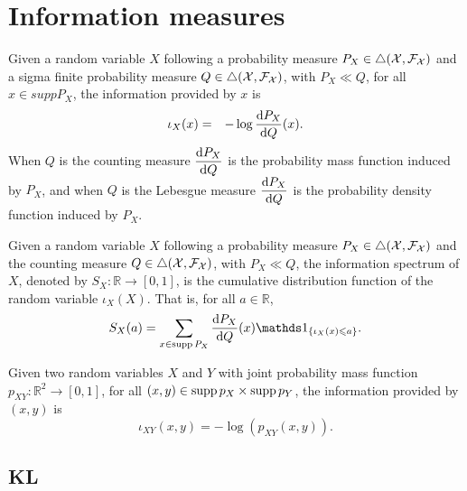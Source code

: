 \documentclass[lettersize,onecolumn]{IEEEtran}
\begin{document}
\section{Information measures}\label{DefInformation} 
\begin{definition} [Information]
Given a random variable $X$ following a probability measure $P_X \in \triangle(\mathcal X, \mathcal F_\mathcal X)$ and a sigma finite probability measure $Q \in \triangle(\mathcal X, \mathcal F_\mathcal X)$, with $P_X\ll Q$, for all $x \in suppP_X$, the information provided by $x$ is
\begin{eqnarray}
\iota_X(x) & =& - \log \displaystyle \frac{\mathrm{d}{P_X}}{\mathrm{d}{Q}}(x).
\end{eqnarray}
When $Q$ is the counting measure $\displaystyle \frac{\mathrm{d}{P_X}}{\mathrm{d}{Q}}$ is the probability mass function induced by $P_X$, and when $Q$ is the Lebesgue measure $\displaystyle \frac{\mathrm{d}{P_X}}{\mathrm{d}{Q}}$ is the probability density function induced by $P_X$.
\end{definition}

\begin{definition}\label{DefInfoSpectrum}  
Given a random variable $X$ following a probability measure $P_X \in \triangle(\mathcal X, \mathcal F_\mathcal X)$ and the counting measure $Q \in \triangle(\mathcal X, \mathcal F_\mathcal X) $, with $P_X\ll Q$, the information spectrum of $X$, denoted by $S_X: \mathds{R} \rightarrow [0,1]$, is the cumulative distribution function of the random variable $\iota_{X}(X)$. That is, for all $a \in \mathds{R}$,
\begin{equation}
S_X(a) = \sum_{x \in \supp{P_X}} \RND{P_X}{Q}(x) \ind{\iota_{X}(x) \leqslant a}.
\end{equation}
\end{definition}

\begin{definition}\label{DefJointInformation} 
Given two random variables $X$ and $Y$  with joint probability mass function $p_{X Y}: \mathds{R}^2 \rightarrow [0,1]$, for all $(x,y) \in \mathrm{supp}\,{p_X} \times \mathrm{supp}\,{p_Y}$, the information provided by  $ (x,y)$ is  
\begin{equation}
\label{EqDefInfo}
\iota_{X Y }(x,y) = -\log\left( p_{X Y }(x, y) \right) .
\end{equation}
\end{definition}

\subsection{KL}
\end{document}
